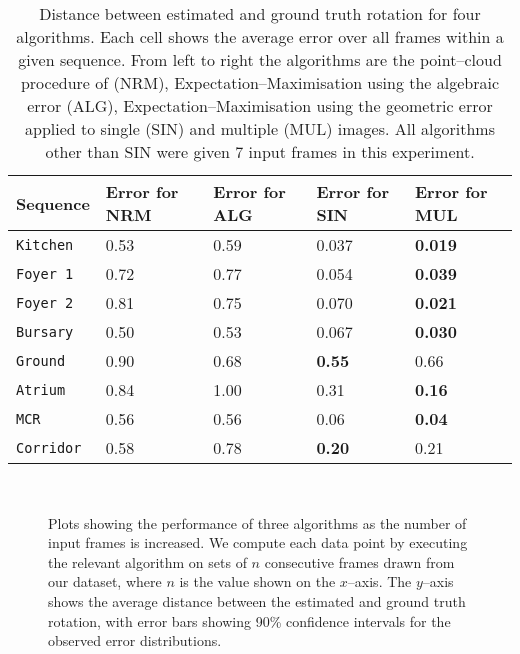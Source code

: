 \begin{table}[tb]
  \centering
  \begin{tabular}{@{}p{2cm}p{3cm}p{3cm}p{3cm}p{3cm}@{}}
    \toprule
    Sequence & Error for NRM & Error for ALG & Error for SIN & Error
    for MUL \\
    \midrule
    \tt{Kitchen}  & 0.53   & 0.59   & 0.037  & \textbf{0.019} \\
    \tt{Foyer 1}   & 0.72   & 0.77   & 0.054  & \textbf{0.039} \\
    \tt{Foyer 2}  & 0.81   & 0.75   & 0.070  & \textbf{0.021} \\
    \tt{Bursary}  & 0.50   & 0.53   & 0.067  & \textbf{0.030} \\
    \tt{Ground}   & 0.90   & 0.68   & \textbf{0.55}   & 0.66 \\
    \tt{Atrium}   & 0.84   & 1.00   & 0.31  & \textbf{0.16} \\
    \tt{MCR}      & 0.56   & 0.56   & 0.06  & \textbf{0.04} \\
    \tt{Corridor} & 0.58   & 0.78   & \textbf{0.20}  & 0.21 \\
    \bottomrule
  \end{tabular}
  \vspace{0.2cm}
  \caption{Distance between estimated and ground truth rotation for
    four algorithms. Each cell shows the average error over all frames
    within a given sequence. From left to right the algorithms are
    the point--cloud procedure of \cite{Furukawa09} (NRM),
    Expectation--Maximisation using the algebraic error (ALG),
    Expectation--Maximisation using the geometric error applied to
    single (SIN) and multiple (MUL) images. All algorithms other than
    SIN were given 7 input frames in this experiment.}
  \label{table:rot-performance}
\end{table}

\begin{figure}[p]
  \centering
  \\
  \caption{Plots showing the performance of three algorithms as the
    number of input frames is increased. We compute each data point by
    executing the relevant algorithm on sets of $n$ consecutive frames
    drawn from our dataset, where $n$ is the value shown on the
    $x$--axis. The $y$--axis shows the average distance between the
    estimated and ground truth rotation, with error bars showing 90\%
    confidence intervals for the observed error distributions.}
  \label{fig:error-vs-nframes}
\end{figure}


